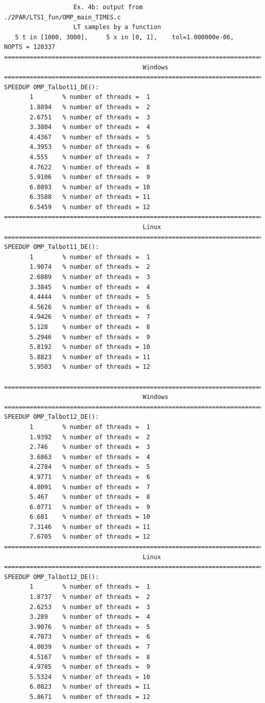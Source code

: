 \documentclass[a4paper,10pt]{report}%
\begin{document}
\begin{lstlisting}
                   Ex. 4b: output from ./2PAR/LTS1_fun/OMP_main_TIMES.c
                   LT samples by a function
   5 t in [1000, 3000],     5 x in [0, 1],    tol=1.000000e-06,    NOPTS = 120337
====================================================================================
                                      Windows
====================================================================================
SPEEDUP OMP_Talbot11_DE():
       1        % number of threads =  1
       1.8894   % number of threads =  2
       2.6751   % number of threads =  3
       3.3804   % number of threads =  4
       4.4367   % number of threads =  5
       4.3953   % number of threads =  6
       4.555    % number of threads =  7
       4.7622   % number of threads =  8
       5.9106   % number of threads =  9
       6.0893   % number of threads = 10
       6.3588   % number of threads = 11
       6.5459   % number of threads = 12
====================================================================================
                                      Linux
====================================================================================
SPEEDUP OMP_Talbot11_DE():
       1        % number of threads =  1
       1.9074   % number of threads =  2
       2.6889   % number of threads =  3
       3.3845   % number of threads =  4
       4.4444   % number of threads =  5
       4.5626   % number of threads =  6
       4.9426   % number of threads =  7
       5.128    % number of threads =  8
       5.2946   % number of threads =  9
       5.8192   % number of threads = 10
       5.8823   % number of threads = 11
       5.9503   % number of threads = 12

====================================================================================
                                      Windows
====================================================================================
SPEEDUP OMP_Talbot12_DE():
       1        % number of threads =  1
       1.9392   % number of threads =  2
       2.746    % number of threads =  3
       3.6863   % number of threads =  4
       4.2784   % number of threads =  5
       4.9771   % number of threads =  6
       4.8091   % number of threads =  7
       5.467    % number of threads =  8
       6.0771   % number of threads =  9
       6.681    % number of threads = 10
       7.3146   % number of threads = 11
       7.6705   % number of threads = 12
====================================================================================
                                      Linux
====================================================================================
SPEEDUP OMP_Talbot12_DE():
       1        % number of threads =  1
       1.8737   % number of threads =  2
       2.6253   % number of threads =  3
       3.289    % number of threads =  4
       3.9076   % number of threads =  5
       4.7073   % number of threads =  6
       4.0039   % number of threads =  7
       4.5167   % number of threads =  8
       4.9785   % number of threads =  9
       5.5324   % number of threads = 10
       6.0823   % number of threads = 11
       5.8671   % number of threads = 12


\end{lstlisting}
\end{document}
